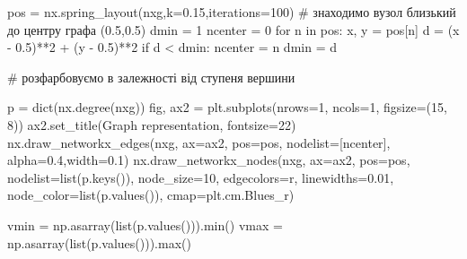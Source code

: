 \documentclass[
  letterpaper,
]{report}
\newenvironment{Shaded}{\begin{snugshade}}{\end{snugshade}}
\newcommand{\BuiltInTok}[1]{\textcolor[rgb]{0.00,0.23,0.31}{#1}}
\newcommand{\CommentTok}[1]{\textcolor[rgb]{0.37,0.37,0.37}{#1}}
\newcommand{\ControlFlowTok}[1]{\textcolor[rgb]{0.00,0.23,0.31}{#1}}
\newcommand{\DecValTok}[1]{\textcolor[rgb]{0.68,0.00,0.00}{#1}}
\newcommand{\FloatTok}[1]{\textcolor[rgb]{0.68,0.00,0.00}{#1}}
\newcommand{\KeywordTok}[1]{\textcolor[rgb]{0.00,0.23,0.31}{#1}}
\newcommand{\NormalTok}[1]{\textcolor[rgb]{0.00,0.23,0.31}{#1}}
\newcommand{\OperatorTok}[1]{\textcolor[rgb]{0.37,0.37,0.37}{#1}}
\newcommand{\StringTok}[1]{\textcolor[rgb]{0.13,0.47,0.30}{#1}}
\begin{document}
\begin{Shaded}
\begin{Highlighting}[]
\NormalTok{pos }\OperatorTok{=}\NormalTok{ nx.spring\_layout(nxg,k}\OperatorTok{=}\FloatTok{0.15}\NormalTok{,iterations}\OperatorTok{=}\DecValTok{100}\NormalTok{)}
\CommentTok{\# знаходимо вузол близький до центру графа (0.5,0.5)}
\NormalTok{dmin }\OperatorTok{=} \DecValTok{1}
\NormalTok{ncenter }\OperatorTok{=} \DecValTok{0}
\ControlFlowTok{for}\NormalTok{ n }\KeywordTok{in}\NormalTok{ pos: }
\NormalTok{    x, y }\OperatorTok{=}\NormalTok{ pos[n]}
\NormalTok{    d }\OperatorTok{=}\NormalTok{ (x }\OperatorTok{{-}} \FloatTok{0.5}\NormalTok{)}\OperatorTok{**}\DecValTok{2} \OperatorTok{+}\NormalTok{ (y }\OperatorTok{{-}} \FloatTok{0.5}\NormalTok{)}\OperatorTok{**}\DecValTok{2}
    \ControlFlowTok{if}\NormalTok{ d }\OperatorTok{\textless{}}\NormalTok{ dmin:}
\NormalTok{        ncenter }\OperatorTok{=}\NormalTok{ n}
\NormalTok{        dmin }\OperatorTok{=}\NormalTok{ d}

\CommentTok{\# розфарбовуємо в залежності від ступеня вершини}

\NormalTok{p }\OperatorTok{=} \BuiltInTok{dict}\NormalTok{(nx.degree(nxg))}
\NormalTok{fig, ax2 }\OperatorTok{=}\NormalTok{ plt.subplots(nrows}\OperatorTok{=}\DecValTok{1}\NormalTok{, ncols}\OperatorTok{=}\DecValTok{1}\NormalTok{, figsize}\OperatorTok{=}\NormalTok{(}\DecValTok{15}\NormalTok{, }\DecValTok{8}\NormalTok{))}
\NormalTok{ax2.set\_title(}\StringTok{\textquotesingle{}Graph representation\textquotesingle{}}\NormalTok{, fontsize}\OperatorTok{=}\DecValTok{22}\NormalTok{)}
\NormalTok{nx.draw\_networkx\_edges(nxg, ax}\OperatorTok{=}\NormalTok{ax2, pos}\OperatorTok{=}\NormalTok{pos, nodelist}\OperatorTok{=}\NormalTok{[ncenter], alpha}\OperatorTok{=}\FloatTok{0.4}\NormalTok{,width}\OperatorTok{=}\FloatTok{0.1}\NormalTok{)}
\NormalTok{nx.draw\_networkx\_nodes(nxg, ax}\OperatorTok{=}\NormalTok{ax2, pos}\OperatorTok{=}\NormalTok{pos, nodelist}\OperatorTok{=}\BuiltInTok{list}\NormalTok{(p.keys()),}
\NormalTok{                       node\_size}\OperatorTok{=}\DecValTok{10}\NormalTok{, edgecolors}\OperatorTok{=}\StringTok{\textquotesingle{}r\textquotesingle{}}\NormalTok{, linewidths}\OperatorTok{=}\FloatTok{0.01}\NormalTok{,}
\NormalTok{                       node\_color}\OperatorTok{=}\BuiltInTok{list}\NormalTok{(p.values()),}
\NormalTok{                       cmap}\OperatorTok{=}\NormalTok{plt.cm.Blues\_r)}
        
\NormalTok{vmin }\OperatorTok{=}\NormalTok{ np.asarray(}\BuiltInTok{list}\NormalTok{(p.values())).}\BuiltInTok{min}\NormalTok{()}
\NormalTok{vmax }\OperatorTok{=}\NormalTok{ np.asarray(}\BuiltInTok{list}\NormalTok{(p.values())).}\BuiltInTok{max}\NormalTok{()}


\end{Highlighting}
\end{Shaded}
\end{document}
